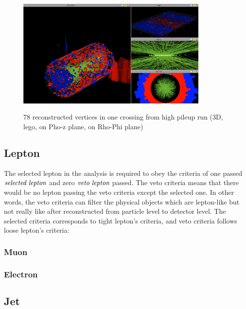 		\begin{figure}[H]
		\centering{}
	    	\includegraphics[width=0.85\textwidth]{Figures/PhysObj/pileup_image.png}\\
		\caption{78 reconstructed vertices in one crossing from high pileup run (3D, lego, on Pho-z plane, on Rho-Phi plane) \cite{Pileup_page}}
		\label{PhysObj:fig:pileup_img}
		\end{figure}
		\FloatBarrier



	\subsection{Lepton}
	\label{ssec:PhysObj_lep}

		The selected lepton in the analysis is required to obey the criteria of one passed $\emph{selected lepton}$ and zero $\emph{veto lepton}$ passed. The veto criteria means that there would be no lepton passing the veto criteria except the selected one. In other words, the veto criteria can filter the physical objects which are lepton-like but not really like after reconstructed from particle level to detector level. The selected criteria corresponds to tight lepton's criteria, and veto criteria follows loose lepton's criteria:

		\subsubsection{Muon}
		\label{sssec:Muon}
			

		\subsubsection{Electron}
		\label{sssec:Electron}

	\subsection{Jet}
	\label{ssec:PhysObj_jet}

